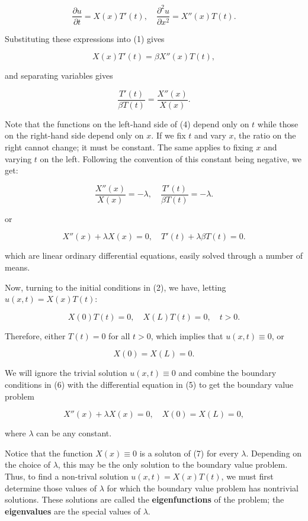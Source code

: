 \documentclass{article}
\begin{document}
\[ \frac{\partial u}{\partial t} = X(x)T'(t), \quad \frac{\partial^2 u}{\partial x^2} = X''(x)T(t). \]

Substituting these expressions into (1) gives

\[ X(x)T'(t) = \beta X''(x)T(t), \]

and separating variables gives

\[ \frac{T'(t)}{\beta T(t)} = \frac{X''(x)}{X(x)}. \tag{4} \]

Note that the functions on the left-hand side of (4) depend only on $t$ while those on the right-hand side depend only on $x$. If we fix $t$ and vary $x$, the ratio on the right cannot change; it must be constant. The same applies to fixing $x$ and varying $t$ on the left. Following the convention of this constant being negative, we get:

\[ \frac{X''(x)}{X(x)} = - \lambda, \quad \frac{T'(t)}{\beta T(t)} = - \lambda. \]

or

\[ X''(x) + \lambda X(x) = 0, \quad T'(t) + \lambda \beta T(t) = 0. \tag{5} \]

which are linear ordinary differential equations, easily solved through a number of means.

Now, turning to the initial conditions in (2), we have, letting $u(x,t) = X(x)T(t)$:

\[ X(0)T(t) = 0, \quad  X(L)T(t) = 0, \quad t > 0. \]

Therefore, either $T(t) = 0$ for all $t > 0$, which implies that $u(x,t) \equiv 0$, or

\[ X(0) = X(L) = 0. \tag{6} \]

We will ignore the trivial solution $u(x,t) \equiv 0$ and combine the boundary conditions in (6) with the differential equation in (5) to get the boundary value problem

\[ X''(x) + \lambda X(x) = 0, \quad X(0) = X(L) = 0, \tag{7} \]

where $\lambda$ can be any constant.

Notice that the function $X(x) \equiv 0$ is a soluton of (7) for every $\lambda$. Depending on the choice of $\lambda$, this may be the only solution to the boundary value problem. Thus, to find a non-trival solution $u(x,t) = X(x)T(t)$, we must first determine those values of $\lambda$ for which the boundary value problem has nontrivial solutions. These solutions are called the \textbf{eigenfunctions} of the problem; the \textbf{eigenvalues} are the special values of $\lambda$.
\end{document}
